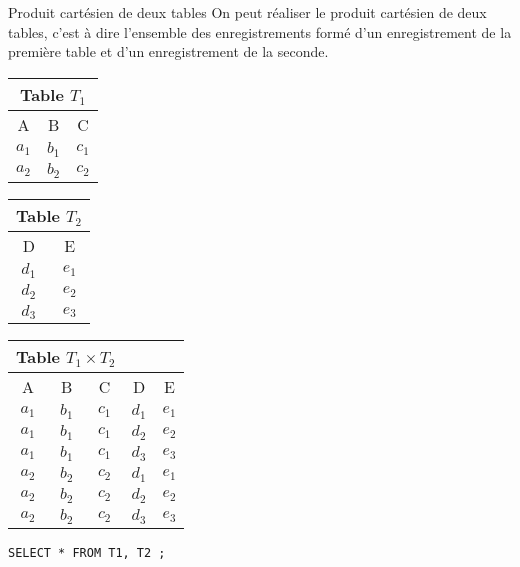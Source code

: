 \documentclass[10pt]{beamer}
\begin{document}
\begin{frame}
	\begin{block}{Produit cartésien de deux tables}
		On peut réaliser le \textcolor{Sepia}{produit cartésien} de deux tables, c'est à dire l'ensemble des enregistrements formé d'un enregistrement de la première table et d'un enregistrement de la seconde.
		\begin{center}
			\begin{tabular}{|c|c|c|}
				\multicolumn{3}{c}{\textcolor{Sepia}{Table $T_1$}} \\
				\hline
				\rowcolor{lightgray} A & B     & C                 \\
				\hline
				$a_1$                  & $b_1$ & $c_1$             \\
				\hline
				$a_2$                  & $b_2$ & $c_2$             \\
				\hline
			\end{tabular} \quad \quad
			\begin{tabular}{|c|c|}
				\multicolumn{2}{c}{\textcolor{Sepia}{Table $T_2$}} \\
				\hline
				\rowcolor{lightgray} D & E                         \\
				\hline
				$d_1$                  & $e_1$                     \\
				\hline
				$d_2$                  & $e_2$                     \\
				\hline
				$d_3$                  & $e_3$                     \\
				\hline
			\end{tabular}
			\quad \quad
			\begin{tabular}{|c|c|c|c|c|}
				\multicolumn{3}{c}{\textcolor{Sepia}{Table $T_1 \times T_2$}} \\
				\hline
				\rowcolor{lightgray} A & B     & C     & D     & E            \\
				\hline
				$a_1$                  & $b_1$ & $c_1$ & $d_1$ & $e_1$        \\
				\hline
				$a_1$                  & $b_1$ & $c_1$ & $d_2$ & $e_2$        \\
				\hline
				$a_1$                  & $b_1$ & $c_1$ & $d_3$ & $e_3$        \\
				\hline
				$a_2$                  & $b_2$ & $c_2$ & $d_1$ & $e_1$        \\
				\hline
				$a_2$                  & $b_2$ & $c_2$ & $d_2$ & $e_2$        \\
				\hline
				$a_2$                  & $b_2$ & $c_2$ & $d_3$ & $e_3$        \\
				\hline
			\end{tabular}
		\end{center} \medskip
		\texttt{SELECT * FROM T1, T2 ;}
	\end{block}
\end{frame}
\end{document}

